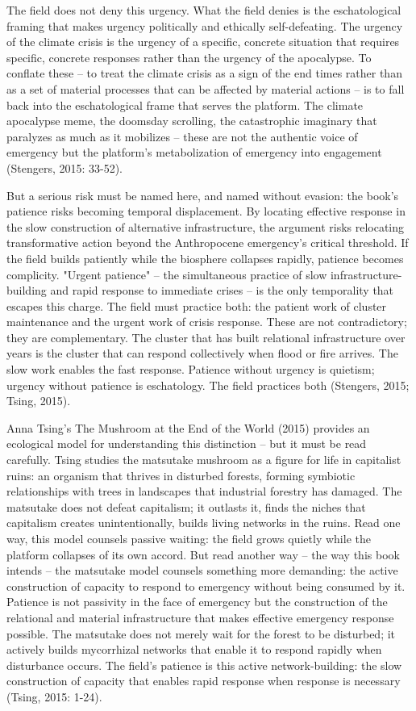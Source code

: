 The field does not deny this urgency. What the field denies is the eschatological framing that makes urgency politically and ethically self-defeating. The urgency of the climate crisis is the urgency of a specific, concrete situation that requires specific, concrete responses rather than the urgency of the apocalypse. To conflate these -- to treat the climate crisis as a sign of the end times rather than as a set of material processes that can be affected by material actions -- is to fall back into the eschatological frame that serves the platform. The climate apocalypse meme, the doomsday scrolling, the catastrophic imaginary that paralyzes as much as it mobilizes -- these are not the authentic voice of emergency but the platform's metabolization of emergency into engagement (Stengers, 2015: 33-52).

But a serious risk must be named here, and named without evasion: the book's patience risks becoming temporal displacement. By locating effective response in the slow construction of alternative infrastructure, the argument risks relocating transformative action beyond the Anthropocene emergency's critical threshold. If the field builds patiently while the biosphere collapses rapidly, patience becomes complicity. "Urgent patience" -- the simultaneous practice of slow infrastructure-building and rapid response to immediate crises -- is the only temporality that escapes this charge. The field must practice both: the patient work of cluster maintenance and the urgent work of crisis response. These are not contradictory; they are complementary. The cluster that has built relational infrastructure over years is the cluster that can respond collectively when flood or fire arrives. The slow work enables the fast response. Patience without urgency is quietism; urgency without patience is eschatology. The field practices both (Stengers, 2015; Tsing, 2015).

Anna Tsing's The Mushroom at the End of the World (2015) provides an ecological model for understanding this distinction -- but it must be read carefully. Tsing studies the matsutake mushroom as a figure for life in capitalist ruins: an organism that thrives in disturbed forests, forming symbiotic relationships with trees in landscapes that industrial forestry has damaged. The matsutake does not defeat capitalism; it outlasts it, finds the niches that capitalism creates unintentionally, builds living networks in the ruins. Read one way, this model counsels passive waiting: the field grows quietly while the platform collapses of its own accord. But read another way -- the way this book intends -- the matsutake model counsels something more demanding: the active construction of capacity to respond to emergency without being consumed by it. Patience is not passivity in the face of emergency but the construction of the relational and material infrastructure that makes effective emergency response possible. The matsutake does not merely wait for the forest to be disturbed; it actively builds mycorrhizal networks that enable it to respond rapidly when disturbance occurs. The field's patience is this active network-building: the slow construction of capacity that enables rapid response when response is necessary (Tsing, 2015: 1-24).

